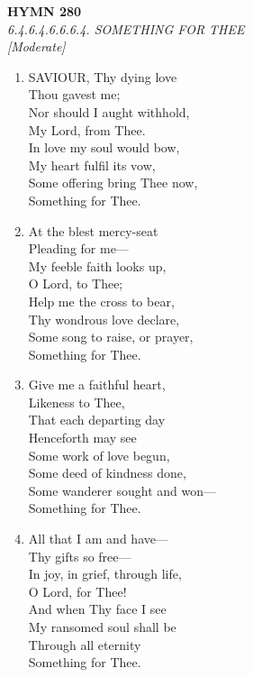 \newpage
\begin{center}
    {\Large \textbf{HYMN 280}}
    \\
    \textit{6.4.6.4.6.6.6.4. SOMETHING FOR THEE}
    \\
    \textit{\small [Moderate]}
\end{center}
\vspace{1em}

\begin{enumerate}
    \item SAVIOUR, Thy dying love \\
        Thou gavest me; \\
        Nor should I aught withhold, \\
        My Lord, from Thee. \\
        In love my soul would bow, \\
        My heart fulfil its vow, \\
        Some offering bring Thee now, \\
        Something for Thee.

    \item At the blest mercy-seat \\
        Pleading for me--- \\
        My feeble faith looks up, \\
        O Lord, to Thee; \\
        Help me the cross to bear, \\
        Thy wondrous love declare, \\
        Some song to raise, or prayer, \\
        Something for Thee.

    \item Give me a faithful heart, \\
        Likeness to Thee, \\
        That each departing day \\
        Henceforth may see \\
        Some work of love begun, \\
        Some deed of kindness done, \\
        Some wanderer sought and won--- \\
        Something for Thee.

    \item All that I am and have--- \\
        Thy gifts so free--- \\
        In joy, in grief, through life, \\
        O Lord, for Thee! \\
        And when Thy face I see \\
        My ransomed soul shall be \\
        Through all eternity \\
        Something for Thee.

\end{enumerate}

